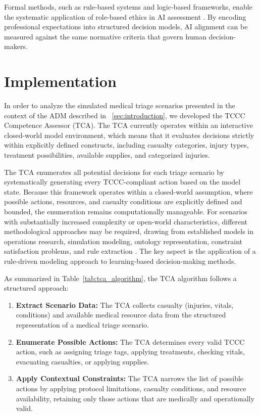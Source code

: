 \documentclass[conference]{IEEEtran}
\begin{document}
Formal methods, such as rule-based systems and logic-based frameworks, enable the systematic application of role-based ethics in AI assessment \cite{wotawa_model-based_2022, sarmiento_action_2023}. By encoding professional expectations into structured decision models, AI alignment can be measured against the same normative criteria that govern human decision-makers.

\section{Implementation}
\label{sec:implementation}
In order to analyze the simulated medical triage scenarios presented in the context of the ADM described in ~\ref{sec:introduction}, we developed the TCCC Competence Assessor (TCA). The TCA currently operates within an interactive closed-world model environment, which means that it evaluates decisions strictly within explicitly defined constructs, including casualty categories, injury types, treatment possibilities, available supplies, and categorized injuries.

The TCA enumerates all potential decisions for each triage scenario by systematically generating every TCCC-compliant action based on the model state. Because this framework operates within a closed-world assumption, where possible actions, resources, and casualty conditions are explicitly defined and bounded, the enumeration remains computationally manageable. For scenarios with substantially increased complexity or open-world characteristics, different methodological approaches may be required, drawing from established models in operations research, simulation modeling, ontology representation, constraint satisfaction problems, and rule extraction \cite{tolmeijer_implementations_2021}. The key aspect is the application of a rule-driven modeling approach to learning-based decision-making methods.

As summarized in Table~\ref{tab:tca_algorithm}, the TCA algorithm follows a structured approach:
\begin{enumerate}
\item \textbf{Extract Scenario Data:} The TCA collects casualty (injuries, vitals, conditions) and available medical resource data from the structured representation of a medical triage scenario.
\item \textbf{Enumerate Possible Actions:} The TCA determines every valid TCCC action, such as assigning triage tags, applying treatments, checking vitals, evacuating casualties, or applying supplies.
\item \textbf{Apply Contextual Constraints:} The TCA narrows the list of possible actions by applying protocol limitations, casualty conditions, and resource availability, retaining only those actions that are medically and operationally valid.
\end{enumerate}
\end{document}
